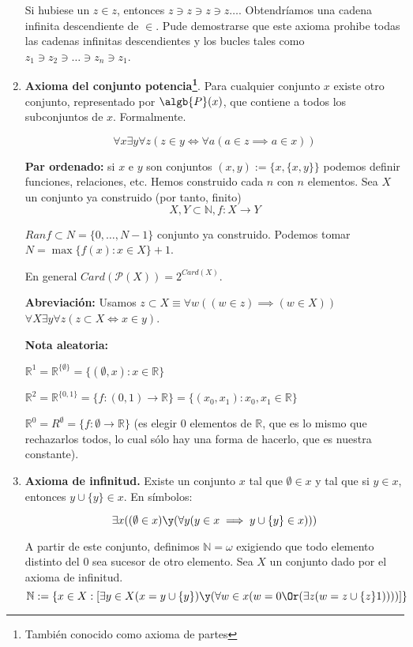 \begin{enumerate}
		 \begin{obs}
		 	Si hubiese un $z\in z$, entonces $z\ni z\ni z\ni z\hdots$. Obtendríamos una cadena infinita descendiente de $\in$.
		 	Pude demostrarse que este axioma prohibe todas las cadenas infinitas descendientes y los bucles tales como $z_1\ni z_2\ni \hdots \ni z_n \ni z_1$.
		 \end{obs}

		 \item \textbf{Axioma del conjunto potencia\footnote{También conocido como axioma de partes}}. Para cualquier conjunto $x$ existe otro conjunto, representado por $\algb{P}(x)$, que contiene a todos los subconjuntos de $x$. Formalmente.

		 \[\forall x \exists y \forall z (z \in y \iff \forall a (a\in z \implies a \in x))\]

		 \textbf{Par ordenado:} si $x$ e $y$ son conjuntos $(x,y):=\{x, \{x,y\} \}$ podemos definir funciones, relaciones, etc. Hemos construido cada $n$ con $n$ elementos. Sea $X$ un conjunto ya construido (por tanto, finito)
		 $$X,Y \subset \mathbb{N}, f:X\to Y$$

		 $Ran f \subset N = \{0, \hdots, N-1\}$ conjunto ya construido. Podemos tomar $N = \max \{f(x): x \in X\} + 1$.

		 En general $Card(\mathcal{P}(X)) = 2^{Card(X)}$.

		 \textbf{Abreviación: } Usamos $z\subset X \equiv \forall w((w\in z)\implies (w\in X))$
		 $\forall X \exists y \forall z(z\subset X\iff x\in y)$.

		 \textbf{Nota aleatoria:}

		 $\mathbb{R}^1 = \mathbb{R}^{\{\emptyset\}} = \{(\emptyset, x): x\in\mathbb{R}\}$

		 $\mathbb{R}^2 = \mathbb{R}^{\{0,1\}} = \{f:(0,1)\to \mathbb{R}\} = \{(x_0, x_1): x_0, x_1 \in \mathbb{R}\}$

		 $\mathbb{R}^0 = R^\emptyset = \{f:\emptyset\to \mathbb{R}\}$ (es elegir 0 elementos de $\mathbb{R}$, que es lo mismo que rechazarlos todos, lo cual sólo hay una forma de hacerlo, que es nuestra constante).

		 \item \textbf{Axioma de infinitud.} Existe un conjunto $x$ tal que $\emptyset \in x$ y tal que si $y\in x$, entonces $y \cup \{y\}\in x$. En símbolos:

		 $$\exists x ((\emptyset\in x)\y (\forall y(y\in x \implies y\cup \{y\} \in x)))$$

		 A partir de este conjunto, definimos $\mathbb{N} = \omega$ exigiendo que todo elemento distinto del 0 sea sucesor de otro elemento. Sea $X$ un conjunto dado por el axioma de infinitud.
		 $$\mathbb{N}:= \{x\in X:\left[\exists y \in X (x=y\cup \{y\})\y (\forall w\in x (w=0\Or (\exists z(w=z\cup \{z\}1)))) \right]\}$$


\end{enumerate}
